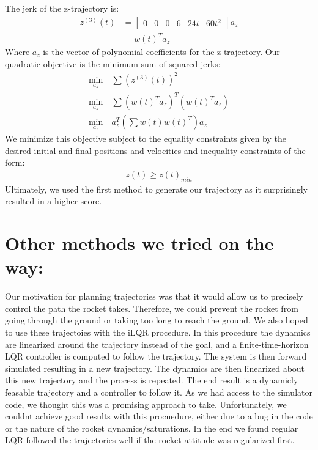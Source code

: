 \documentclass{article}
\begin{document}
\noindent The jerk of the z-trajectory is:
\begin{align}
     z^{(3)}(t) &= \begin{bmatrix} 0 & 0 & 0 & 6 & 24t & 60 t^2 \end{bmatrix} a_z \\
                &= w(t)^T a_z
\end{align}
Where $a_z$ is the vector of polynomial coefficients for the z-trajectory.
Our quadratic objective is the minimum sum of squared jerks:
\begin{align}
    \min_{a_z} & \ \sum \left(z^{(3)}(t)\right)^2\\
    \min_{a_z} & \ \sum (w(t)^Ta_z)^T(w(t)^Ta_z) \\
    \min_{a_z} & \  a_z^T \left(\sum w(t)w(t)^T \right) a_z 
\end{align}
We minimize this objective subject to the equality constraints given by the desired
initial and final positions and velocities and inequality constraints of the form:
\begin{align}
    z(t) \ge z(t)_{min}
\end{align}
Ultimately, we used the first method to generate our trajectory as it
surprisingly resulted in a higher score.

\section{Other methods we tried on the way:}
Our motivation for planning trajectories was that it would allow us to
precisely control the path the rocket takes. Therefore, we could prevent the
rocket from going through the ground or taking too long to reach the ground. We
also hoped to use these trajectoies with the iLQR procedure. In this procedure
the dynamics are linearized around the trajectory instead of the goal, and a
finite-time-horizon LQR controller is computed to follow the trajectory. The
system is then forward simulated resulting in a new trajectory. The dynamics
are then linearized about this new trajectory and the process is repeated. The end
result is a dynamicly feasable trajectory and a controller to follow it. As we
had access to the simulator code, we thought this was a promising approach to take.
Unfortunately, we couldnt achieve good results with this procuedure, either due
to a bug in the code or the nature of the rocket dynamics/saturations. In the end
we found regular LQR followed the trajectories well if the rocket attitude was 
regularized first.
\end{document}
